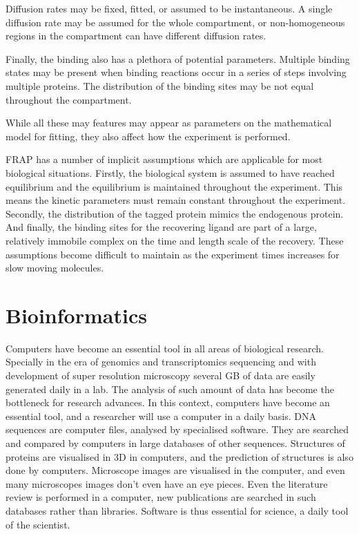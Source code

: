     Diffusion rates may be fixed, fitted, or assumed to be instantaneous.
    A single diffusion rate may be assumed for the whole
    compartment, or non-homogeneous regions in the compartment
    can have different diffusion rates.

    Finally, the binding also has a plethora of potential parameters.  Multiple
    binding states may be present when binding reactions occur in a
    series of steps involving multiple proteins.  The distribution of
    the binding sites may be not equal throughout the compartment.

    While all these may features may appear
    as parameters on the mathematical model for
    fitting, they also affect how the experiment is performed.

    FRAP has a number of implicit assumptions which are applicable
    for most biological situations.
    Firstly, the biological system is assumed to have
    reached equilibrium and the equilibrium
    is maintained throughout the experiment.
    This means the kinetic parameters
    must remain constant throughout the experiment.
    Secondly, the distribution of the tagged protein mimics the endogenous
    protein.
    And finally, the binding sites for the recovering ligand
    are part of a large, relatively immobile
    complex on the time and length scale of the recovery.
    These assumptions become difficult to maintain as the experiment
    times increases for slow moving molecules.

\section{Bioinformatics}

  Computers have become an essential tool in all areas of biological
  research.  Specially in the era of genomics and transcriptomics
  sequencing and with development of super resolution microscopy
  several GB of data are easily generated daily in a lab.  The
  analysis of such amount of data has become the bottleneck for
  research advances.  In this context, computers have become an
  essential tool, and a researcher will use a computer in a daily
  basis.  DNA sequences are computer files, analysed by specialised
  software.  They are searched and compared by computers in large
  databases of other sequences.  Structures of proteins are visualised
  in 3D in computers, and the prediction of structures is also done by
  computers.  Microscope images are visualised in the computer, and
  even many microscopes images don't even have an eye pieces.  Even
  the literature review is performed in a computer, new publications
  are searched in such databases rather than libraries.  Software is
  thus essential for science, a daily tool of the scientist.

